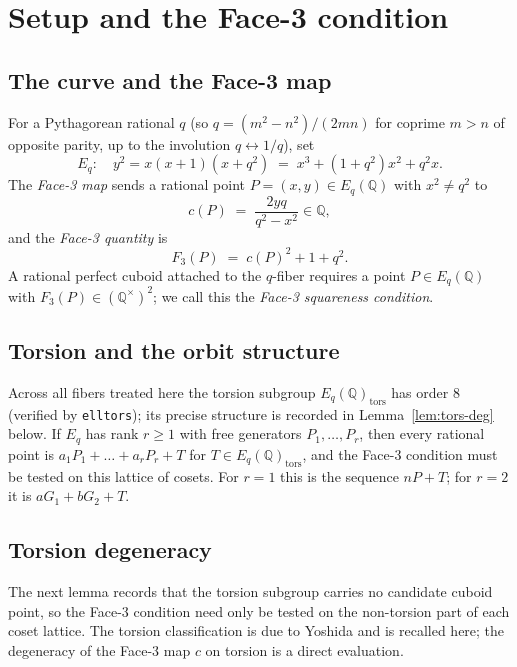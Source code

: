 \documentclass[11pt,reqno]{amsart}
\theoremstyle{plain}
\theoremstyle{definition}
\newcommand{\Q}{\mathbb{Q}}
\begin{document}
\section{Setup and the Face-3 condition}

\subsection{The curve and the Face-3 map}
For a Pythagorean rational $q$ (so $q=(m^2-n^2)/(2mn)$ for coprime $m>n$ of
opposite parity, up to the involution $q\leftrightarrow 1/q$), set
\begin{equation}\label{eq:Eq}
  E_q\colon\quad y^2=x(x+1)(x+q^2)
  \;=\;x^3+(1+q^2)x^2+q^2x.
\end{equation}
The \emph{Face-3 map} sends a rational point $P=(x,y)\in E_q(\Q)$ with
$x^2\neq q^2$ to
\begin{equation}\label{eq:c}
  c(P)\;=\;\frac{2yq}{q^2-x^2}\in\Q,
\end{equation}
and the \emph{Face-3 quantity} is
\begin{equation}\label{eq:F3}
  F_3(P)\;=\;c(P)^2+1+q^2.
\end{equation}
A rational perfect cuboid attached to the $q$-fiber requires a point
$P\in E_q(\Q)$ with $F_3(P)\in(\Q^\times)^2$; we call this the \emph{Face-3
squareness condition}.

\subsection{Torsion and the orbit structure}
Across all fibers treated here the torsion subgroup $E_q(\Q)_{\mathrm{tors}}$
has order $8$ (verified by \texttt{elltors}); its precise structure is recorded
in Lemma~\ref{lem:tors-deg} below. If $E_q$ has rank $r\ge1$ with
free generators $P_1,\dots,P_r$, then every rational point is
$a_1P_1+\dots+a_rP_r+T$ for $T\in E_q(\Q)_{\mathrm{tors}}$, and the Face-3
condition must be tested on this lattice of cosets. For $r=1$ this is the
sequence $nP+T$; for $r=2$ it is $aG_1+bG_2+T$.

\subsection{Torsion degeneracy}
The next lemma records that the torsion subgroup carries no candidate cuboid
point, so the Face-3 condition need only be tested on the non-torsion part of
each coset lattice. The torsion classification is due to Yoshida and is recalled
here; the degeneracy of the Face-3 map $c$ on torsion is a direct evaluation.
\end{document}
